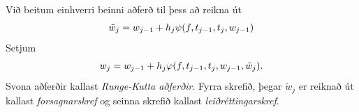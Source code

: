 \documentclass[letterpaper,10pt,icelandic]{sphinxmanual}
\begin{document}
Við beitum einhverri beinni aðferð til þess að reikna út
\begin{gather}
\begin{split}\tilde w_j=w_{j-1}+h_j\psi(f,t_{j-1},t_j,w_{j-1})\end{split}\notag
\end{gather}
Setjum
\begin{gather}
\begin{split}w_j=w_{j-1}+h_j\varphi(f,t_{j-1},t_j,w_{j-1},\tilde w_j).\end{split}\notag
\end{gather}
Svona aðferðir kallast \emph{Runge-Kutta aðferðir}. Fyrra skrefið, þegar
\(\tilde w_j\) er reiknað út kallast \emph{forsagnarskref} og
seinna skrefið kallast \emph{leiðréttingarskref}.

\end{document}
